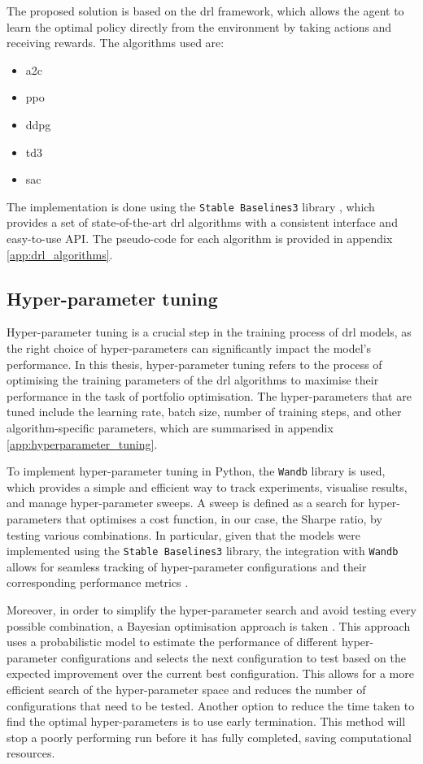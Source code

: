 The proposed solution is based on the \acrshort{drl} framework, which allows the agent to learn the optimal policy directly from the environment by taking actions and receiving rewards. The algorithms used are:
\begin{itemize}
    \item \acrfull{a2c}
    \item \acrfull{ppo}
    \item \acrfull{ddpg}
    \item \acrfull{td3}
    \item \acrfull{sac}
\end{itemize}

The implementation is done using the \texttt{Stable Baselines3} library \cite{Raffin2021}, which provides a set of state-of-the-art \acrshort{drl} algorithms with a consistent interface and easy-to-use API. The pseudo-code for each algorithm is provided in appendix \ref{app:drl_algorithms}.

\subsection{Hyper-parameter tuning} \label{subsec:hyperparameter-tuning}

Hyper-parameter tuning is a crucial step in the training process of \acrshort{drl} models, as the right choice of hyper-parameters can significantly impact the model's performance. In this thesis, hyper-parameter tuning refers to the process of optimising the training parameters of the \acrshort{drl} algorithms to maximise their performance in the task of portfolio optimisation. The hyper-parameters that are tuned include the learning rate, batch size, number of training steps, and other algorithm-specific parameters, which are summarised in appendix \ref{app:hyperparameter_tuning}. 

To implement hyper-parameter tuning in Python, the \texttt{Wandb} \cite{wandb} library is used, which provides a simple and efficient way to track experiments, visualise results, and manage hyper-parameter sweeps. A sweep is defined as a search for hyper-parameters that optimises a cost function, in our case, the Sharpe ratio, by testing various combinations. In particular, given that the models were implemented using the \texttt{Stable Baselines3} library, the integration with \texttt{Wandb} allows for seamless tracking of hyper-parameter configurations and their corresponding performance metrics \cite{WeightsBiases2025}. 

Moreover, in order to simplify the hyper-parameter search and avoid testing every possible combination, a Bayesian optimisation approach is taken \cite{Falkner2018}. This approach uses a probabilistic model to estimate the performance of different hyper-parameter configurations and selects the next configuration to test based on the expected improvement over the current best configuration. This allows for a more efficient search of the hyper-parameter space and reduces the number of configurations that need to be tested. Another option to reduce the time taken to find the optimal hyper-parameters is to use early termination. This method will stop a poorly performing run before it has fully completed, saving computational resources.

